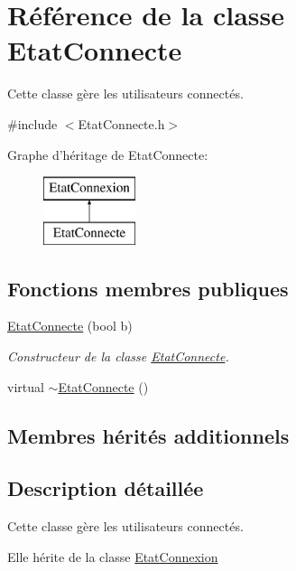 \hypertarget{class_etat_connecte}{\section{Référence de la classe Etat\-Connecte}
\label{class_etat_connecte}
}


Cette classe gère les utilisateurs connectés.  




{\ttfamily \#include $<$Etat\-Connecte.\-h$>$}

Graphe d'héritage de Etat\-Connecte\-:\begin{figure}[H]
\begin{center}
\leavevmode
\includegraphics[height=2.000000cm]{class_etat_connecte}
\end{center}
\end{figure}
\subsection*{Fonctions membres publiques}
\begin{DoxyCompactItemize}
\item 
\hyperlink{class_etat_connecte_ab6bab0d2f0717b3803f75efe27e1915a}{Etat\-Connecte} (bool b)
\begin{DoxyCompactList}\small\item\em Constructeur de la classe \hyperlink{class_etat_connecte}{Etat\-Connecte}. \end{DoxyCompactList}\item 
virtual \hyperlink{class_etat_connecte_acc23dcca21e5e3f3d1af41a6ae615e8b}{$\sim$\-Etat\-Connecte} ()
\end{DoxyCompactItemize}
\subsection*{Membres hérités additionnels}


\subsection{Description détaillée}
Cette classe gère les utilisateurs connectés. 

Elle hérite de la classe \hyperlink{class_etat_connexion}{Etat\-Connexion} 

